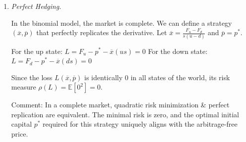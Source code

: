 \begin{enumerate}
            Let $F_u = F((1+u)s)$ and $F_d = F((1+d)s)$.
            We know $\Delta S$ takes values $us$ with probability $q$ and $ds$ with probability $1-q$.
            \begin{align*}
                  \mathbb{E}[\Delta S]       & = q(us) + (1-q)(ds) = s(qu + (1-q)d)                 \\
                  \mathbb{E}[\Delta S^2]     & = q(u^2 s^2) + (1-q)(d^2 s^2) = s^2(qu^2 + (1-q)d^2) \\
                  \mathbb{E}[F(S_1)]         & = qF_u + (1-q)F_d                                    \\
                  \mathbb{E}[F(S_1)\Delta S] & = qF_u(us) + (1-q)F_d(ds) = s(quF_u + (1-q)dF_d)
            \end{align*}

            Using the hint $\mathrm{var}(\Delta S) = s^2 q(1-q)(u-d)^2$, we evaluate the coefficient for $F_u$ in the $p^*$ formula:
            \[ \frac{q s^2(qu^2 + (1-q)d^2) - s(qu + (1-q)d) \cdot q u s}{s^2 q(1-q)(u-d)^2} \]
            \[ = \frac{q(qu^2 + (1-q)d^2 - qu^2 - (1-q)ud)}{q(1-q)(u-d)^2} = \frac{q(1-q)d(d-u)}{q(1-q)(u-d)^2} = \frac{-d}{u-d} \]

            Similarly, evaluating the coefficient for $F_d$:
            \[ \frac{(1-q) s^2(qu^2 + (1-q)d^2) - s(qu + (1-q)d) \cdot (1-q) d s}{s^2 q(1-q)(u-d)^2} \]
            \[ = \frac{(1-q)(qu^2 + (1-q)d^2 - qud - (1-q)d^2)}{q(1-q)(u-d)^2} = \frac{(1-q)qu(u-d)}{q(1-q)(u-d)^2} = \frac{u}{u-d} \]

            Summing these parts gives:
            \[ p^* = -\frac{d}{u-d}F((1+u)s) + \frac{u}{u-d}F((1+d)s) \]

            This matches the arbitrage-free price. In a binomial model with $r=0$, the risk-neutral probabilities are $\pi_u = \frac{0-d}{u-d}$ and $\pi_d = \frac{u-0}{u-d}$. The arbitrage-free price is $\pi_u F_u + \pi_d F_d$, which is exactly what we derived for $p^*$.

      \item \textsl{Perfect Hedging.}

            In the binomial model, the market is complete. We can define a strategy $(\overline{x}, \overline{p})$ that perfectly replicates the derivative.
            Let $\overline{x} = \frac{F_u - F_d}{s(u-d)}$ and $\overline{p} = p^*$.

            For the up state: $L = F_u - p^* - \overline{x}(us) = 0$
            For the down state: $L = F_d - p^* - \overline{x}(ds) = 0$

            Since the loss $L(\overline{x}, \overline{p})$ is identically 0 in all states of the world, its risk measure $\rho(L) = \mathbb{E}[0^2] = 0$.

            Comment: In a complete market, quadratic risk minimization \& perfect replication are equivalent. The minimal risk is zero, and the optimal initial capital $p^*$ required for this strategy uniquely aligns with the arbitrage-free price.

\end{enumerate}